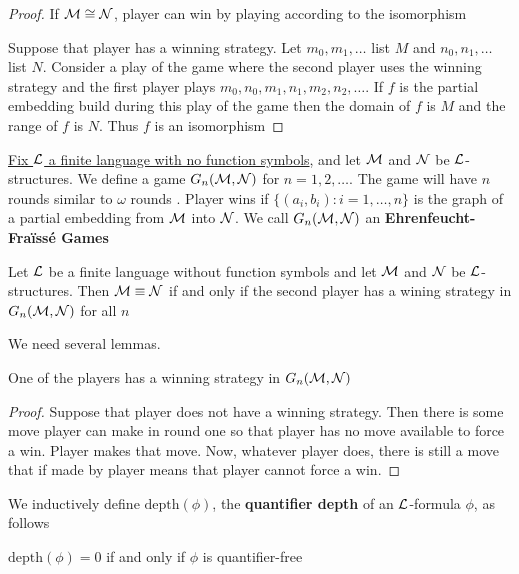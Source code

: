 \documentclass[11pt]{article}
\begin{document}
\begin{proof}
If \(\mathcal{M}\cong\mathcal{N}\), player  can win by playing according to the
isomorphism

Suppose that player  has a winning strategy. Let \(m_0,m_1,\dots\)
list \(M\) and \(n_0,n_1,\dots\) list \(N\). Consider a play of the game where
the second player uses the winning strategy and the first player plays 
\(m_0,n_0,m_1,n_1,m_2,n_2,\dots\). If \(f\) is the partial embedding build
during this play of the game then the domain of \(f\) is \(M\) and the range
of \(f\) is \(N\). Thus \(f\) is an isomorphism
\end{proof}


\uline{Fix \(\mathcal{L}\) a finite language with no function symbols}, and let \(\mathcal{M}\)
and \(\mathcal{N}\) be \(\mathcal{L}\)-structures. We define a game \(G_n(\mathcal{M},\mathcal{N})\)
for \(n=1,2,\dots\). The game will have \(n\) rounds similar to \(\omega\) rounds
. Player  wins if
\(\{(a_i,b_i):i=1,\dots,n\}\) is the graph of a partial embedding from
\(\mathcal{M}\) into \(\mathcal{N}\). We call \(G_n(\mathcal{M},\mathcal{N})\) an 
\textbf{Ehrenfeucht-Fraïssé Games}
\begin{theorem}[]
Let \(\mathcal{L}\) be a finite language without function symbols and let
\(\mathcal{M}\) and \(\mathcal{N}\) be \(\mathcal{L}\)-structures. Then \(\mathcal{M}\equiv\mathcal{N}\)
if and only if the second player has a wining strategy in
\(G_n(\mathcal{M},\mathcal{N})\) for all \(n\)
\end{theorem}

We need several lemmas.

\begin{lemma}[]
One of the players has a winning strategy in \(G_n(\mathcal{M},\mathcal{N})\)
\end{lemma}

\begin{proof}
Suppose that player  does not have a winning strategy. Then there is
some move player  can make in round one so that player  has no
move available to force a win. Player  makes that move. Now, whatever
player  does, there is still a move that if made by player 
means that player  cannot force a win.
\end{proof}

We inductively define \(\text{depth}(\phi)\), the \textbf{quantifier depth} of an
\(\mathcal{L}\)-formula \(\phi\), as follows

\(\text{depth}(\phi)=0\) if and only if \(\phi\) is quantifier-free
\end{document}
